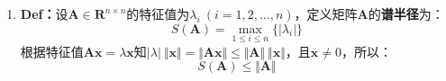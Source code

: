 \begin{enumerate}
    $\mathbf{R}^{n \times n}$中常见的几种范数有：
    \begin{align}
        \Vert \boldsymbol{A} \Vert_1 \ &= \max_{1 \leqslant j \leqslant n} \sum\limits_{i=1}\limits^{n} \vert a_{ij} \vert \quad \text{\small ($\boldsymbol{A}$的列范数)}\\[3mm]
        \Vert \boldsymbol{A} \Vert_\infty &= \max_{1 \leqslant i \leqslant n} \sum\limits_{j=1}\limits^{n} \vert a_{ij} \vert \quad \text{\small ($\boldsymbol{A}$的行范数)}\\[3mm]
        \Vert \boldsymbol{A} \Vert_2 \ &= \sqrt{\lambda_{\max}(\boldsymbol{A}^T\boldsymbol{A})} \quad \text{\small ($\boldsymbol{A}$的谱范数)}\\[4mm]
        \Vert \boldsymbol{A} \Vert_\mathrm{F} \ &= (\sum\limits_{i,j=1}\limits^{n}a_{ij}^{2})^{\frac{1}{2}} \quad \text{\small ($\boldsymbol{A}$的F范数)}
    \end{align}
    其中$\boldsymbol{A}=(a_{ij})_{n \times n},\ \lambda_{\max}(\boldsymbol{A}^T\boldsymbol{A})$为$\boldsymbol{A}^T\boldsymbol{A}$的最大特征值。

    向量和矩阵范数的相容性：
    \begin{equation*}
        \Vert \boldsymbol{Ax} \Vert_s \leqslant \Vert \boldsymbol{A} \Vert \ \Vert \boldsymbol{x} \Vert_s \quad \forall \boldsymbol{A} \in \mathbf{R}^{n \times n}, x \in \mathbf{R}^n
    \end{equation*}

    \textbf{def：}设$\{ \boldsymbol{A}^{(k)} \}$为$\mathbf{R}^{n\times n}$中的矩阵序列，$\boldsymbol{A} \in \mathbf{R}^{n\times n}$，若：
    \begin{equation*}
        \lim_{k\rightarrow \infty} a_{ij}^{(k)} = a_{ij} \quad (i,j=1,2,\dots,n)
    \end{equation*}
    则称向量序列$\{ \boldsymbol{A}^{(k)} \}$收敛于$\boldsymbol{A}$，并有如下\textbf{th}成立：
    \begin{equation*}
        \lim_{k\rightarrow \infty} \boldsymbol{A}^{(k)} = \boldsymbol{A} \Leftrightarrow \lim_{k\rightarrow \infty} \Vert \boldsymbol{A}^{(k)} - \boldsymbol{A} \Vert = 0
    \end{equation*}


    \newpage
    \item \textbf{Def：}设$\boldsymbol{A} \in \mathbf{R}^{n\times n}$的特征值为$\lambda_i\ (i=1,2,\dots,n)$，定义矩阵$\boldsymbol{A}$的\textbf{谱半径}为：
    \begin{equation*}
        S(\boldsymbol{A}) = \max_{1\leqslant i \leqslant n}\{\vert\lambda_i\vert\}
    \end{equation*}
    根据特征值$\boldsymbol{Ax}=\lambda\boldsymbol{x}$知$\vert \lambda \vert \ \Vert \boldsymbol{x}\Vert = \Vert\boldsymbol{Ax}\Vert \leqslant \Vert\boldsymbol{A}\Vert \ \Vert\boldsymbol{x}\Vert$，且$\boldsymbol{x} \neq 0$，所以：
    \begin{equation*}
        S(\boldsymbol{A}) \leqslant \Vert\boldsymbol{A}\Vert
    \end{equation*}


\end{enumerate}
